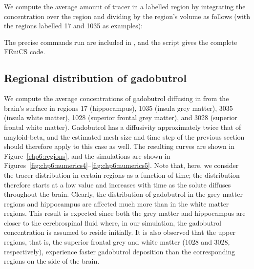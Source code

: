 \noindent We compute the average amount of tracer in a labelled region by
integrating the concentration over the region and dividing by the
region's volume as follows (with the regions labelled 17 and 1035 as
examples):

\noindent The precise commands run are included in
, and the script
 gives the complete
FEniCS code.

\subsection{Regional distribution of gadobutrol}
We compute the average concentrations of gadobutrol diffusing in from
the brain's surface in regions 17 (hippocampus), 1035 (insula grey
matter), 3035 (insula white matter), 1028 (superior frontal grey
matter), and 3028 (superior frontal white matter).  Gadobutrol has a
diffusivity approximately twice that of amyloid-beta, and the
estimated mesh size and time step of the previous section should therefore apply
to this case as well.  The resulting curves are shown in
Figure~\ref{chp6:regions}, and the simulations are shown in
Figures~\ref{fig:chp6:numerics4}--\ref{fig:chp6:numerics5}. Note that, here, 
we consider the tracer distribution in certain regions as a
function of time; the distribution therefore starts at a low value and increases 
with time as the solute diffuses throughout the brain. Clearly, the
distribution of gadobutrol in the grey matter regions and hippocampus
are affected much more than in the white matter regions. This result is
expected since both the grey matter and hippocampus are
closer to the cerebrospinal fluid where, in our simulation, the gadobutrol
concentration is assumed to reside initially.  It is also observed
that the upper regions, that is, the superior frontal grey and white matter
(1028 and 3028, respectively), experience faster gadobutrol deposition
than the corresponding regions on the side of the brain.
